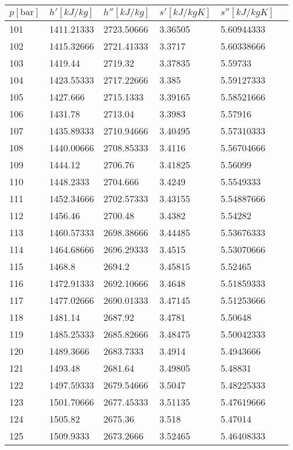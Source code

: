 \documentclass[twocolumn]{article}
\begin{document}
\begin{tabular}{l|l|l|l|l|l}
	$p [\text{bar}] $ & $h' [kJ/kg]$ & $h'' [kJ/kg]$ & $s' [kJ/kg K] $ & $s'' [kJ/kg K]$ \\ \hline
101	&	1411.21333	&	2723.50666	&	3.36505	&	5.60944333 \\ \hline
102	&	1415.32666	&	2721.41333	&	3.3717	&	5.60338666 \\ \hline
103	&	1419.44	&	2719.32	&	3.37835	&	5.59733 \\ \hline
104	&	1423.55333	&	2717.22666	&	3.385	&	5.59127333 \\ \hline
105	&	1427.666	&	2715.1333	&	3.39165	&	5.58521666 \\ \hline
106	&	1431.78	&	2713.04	&	3.3983	&	5.57916 \\ \hline
107	&	1435.89333	&	2710.94666	&	3.40495	&	5.57310333 \\ \hline
108	&	1440.00666	&	2708.85333	&	3.4116	&	5.56704666 \\ \hline
109	&	1444.12	&	2706.76	&	3.41825	&	5.56099 \\ \hline
110	&	1448.2333	&	2704.666	&	3.4249	&	5.5549333 \\ \hline
111	&	1452.34666	&	2702.57333	&	3.43155	&	5.54887666 \\ \hline
112	&	1456.46	&	2700.48	&	3.4382	&	5.54282 \\ \hline
113	&	1460.57333	&	2698.38666	&	3.44485	&	5.53676333 \\ \hline
114	&	1464.68666	&	2696.29333	&	3.4515	&	5.53070666 \\ \hline
115	&	1468.8	&	2694.2	&	3.45815	&	5.52465 \\ \hline
116	&	1472.91333	&	2692.10666	&	3.4648	&	5.51859333 \\ \hline
117	&	1477.02666	&	2690.01333	&	3.47145	&	5.51253666 \\ \hline
118	&	1481.14	&	2687.92	&	3.4781	&	5.50648 \\ \hline
119	&	1485.25333	&	2685.82666	&	3.48475	&	5.50042333 \\ \hline
120	&	1489.3666	&	2683.7333	&	3.4914	&	5.4943666 \\ \hline
121	&	1493.48	&	2681.64	&	3.49805	&	5.48831 \\ \hline
122	&	1497.59333	&	2679.54666	&	3.5047	&	5.48225333 \\ \hline
123	&	1501.70666	&	2677.45333	&	3.51135	&	5.47619666 \\ \hline
124	&	1505.82	&	2675.36	&	3.518	&	5.47014 \\ \hline
125	&	1509.9333	&	2673.2666	&	3.52465	&	5.46408333 \\ \hline

\end{tabular}
\end{document}
